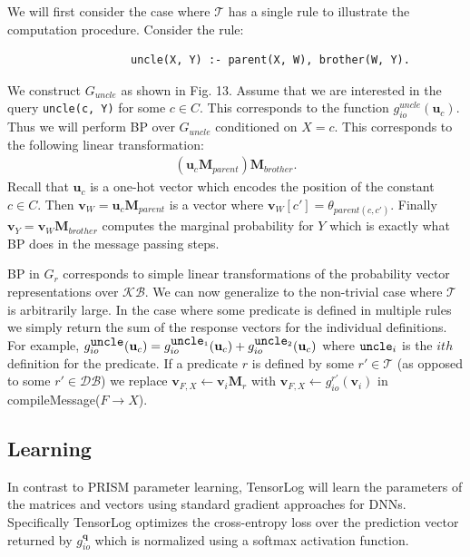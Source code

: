 \documentclass[11pt]{article}
\begin{document}
We will first consider the case where $\mathcal{T}$ has a single rule to illustrate the computation procedure.  Consider the rule: 
\begin{verbatim}
                   uncle(X, Y) :- parent(X, W), brother(W, Y).
\end{verbatim}
We construct $G_{uncle}$ as shown in Fig. 13.  Assume that we are interested in the query \verb!uncle(c, Y)! for some $c \in C$.  This corresponds to the function $g_{io}^{uncle}(\textbf{u}_c)$.  Thus we will perform BP over $G_{uncle}$ conditioned on $X = c$.  This corresponds to the following linear transformation:
\begin{gather*}
(\textbf{u}_c \textbf{M}_{parent})\textbf{M}_{brother}.
\end{gather*}
Recall that $\textbf{u}_c$ is a one-hot vector which encodes the position of the constant $c \in C$.  Then $\textbf{v}_W = \textbf{u}_c \textbf{M}_{parent}$ is a vector where $\textbf{v}_W[c'] = \theta_{parent(c, c')}$.  Finally $\textbf{v}_Y = \textbf{v}_W \textbf{M}_{brother}$ computes the marginal probability for $Y$ which is exactly what BP does in the message passing steps.

BP in $G_r$ corresponds to simple linear transformations of the probability vector representations over $\mathcal{KB}$.  We can now generalize to the non-trivial case where $\mathcal{T}$ is arbitrarily large.  In the case where some predicate is defined in multiple rules we simply return the sum of the response vectors for the individual definitions.  For example, $g_{io}^{\verb!uncle!}(\textbf{u}_c) = g_{io}^{\verb!uncle!_1}(\textbf{u}_c) + g_{io}^{\verb!uncle!_2}(\textbf{u}_c)$ where $\verb!uncle!_i$ is the $ith$ definition for the predicate.  If a predicate $r$ is defined by some $r' \in \mathcal{T}$ (as opposed to some $r' \in \mathcal{DB}$) we replace $\textbf{v}_{F, X} \leftarrow \textbf{v}_i \textbf{M}_r$ with $\textbf{v}_{F, X} \leftarrow g_{io}^{r'}(\textbf{v}_i)$ in compileMessage($F \rightarrow X$).

\subsection{Learning}
In contrast to PRISM parameter learning, TensorLog will learn the parameters of the matrices and vectors using standard gradient approaches for DNNs.  Specifically TensorLog optimizes the cross-entropy loss over the prediction vector returned by $g_{io}^{\textbf{q}}$ which is normalized using a softmax activation function.
\end{document}
